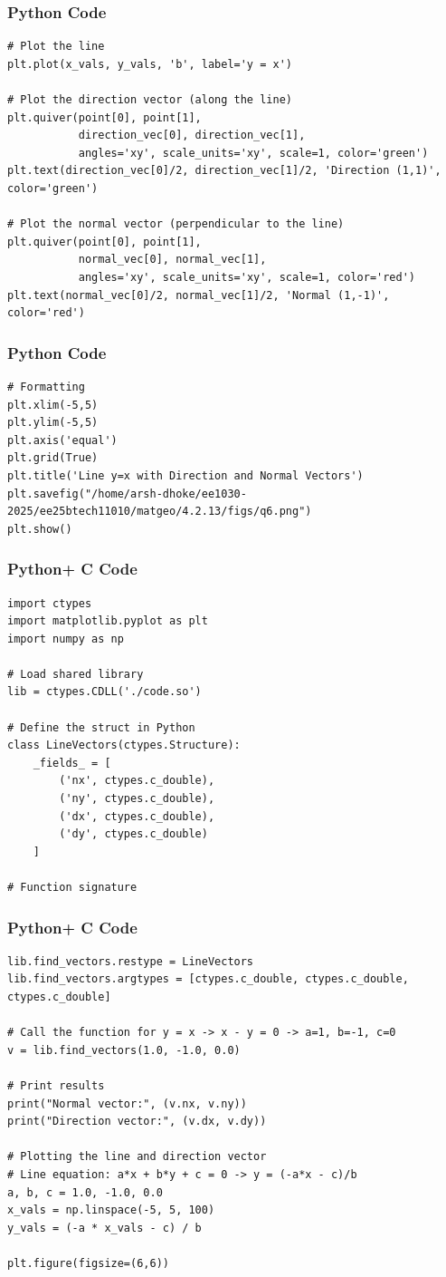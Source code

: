 \documentclass{beamer}
\begin{document}
\begin{frame}[fragile]
    \frametitle{Python Code}
\begin{lstlisting}
# Plot the line
plt.plot(x_vals, y_vals, 'b', label='y = x')

# Plot the direction vector (along the line)
plt.quiver(point[0], point[1],
           direction_vec[0], direction_vec[1],
           angles='xy', scale_units='xy', scale=1, color='green')
plt.text(direction_vec[0]/2, direction_vec[1]/2, 'Direction (1,1)', color='green')

# Plot the normal vector (perpendicular to the line)
plt.quiver(point[0], point[1],
           normal_vec[0], normal_vec[1],
           angles='xy', scale_units='xy', scale=1, color='red')
plt.text(normal_vec[0]/2, normal_vec[1]/2, 'Normal (1,-1)', color='red')
\end{lstlisting}
\end{frame}

\begin{frame}[fragile]
    \frametitle{Python Code}
\begin{lstlisting}
# Formatting
plt.xlim(-5,5)
plt.ylim(-5,5)
plt.axis('equal')
plt.grid(True)
plt.title('Line y=x with Direction and Normal Vectors')
plt.savefig("/home/arsh-dhoke/ee1030-2025/ee25btech11010/matgeo/4.2.13/figs/q6.png")
plt.show()

\end{lstlisting}
\end{frame}

\begin{frame}[fragile]
    \frametitle{Python+ C Code}
\begin{lstlisting}
import ctypes
import matplotlib.pyplot as plt
import numpy as np

# Load shared library
lib = ctypes.CDLL('./code.so')  

# Define the struct in Python
class LineVectors(ctypes.Structure):
    _fields_ = [
        ('nx', ctypes.c_double),
        ('ny', ctypes.c_double),
        ('dx', ctypes.c_double),
        ('dy', ctypes.c_double)
    ]

# Function signature
\end{lstlisting}
\end{frame}

\begin{frame}[fragile]
    \frametitle{Python+ C Code}
\begin{lstlisting}
lib.find_vectors.restype = LineVectors
lib.find_vectors.argtypes = [ctypes.c_double, ctypes.c_double, ctypes.c_double]

# Call the function for y = x -> x - y = 0 -> a=1, b=-1, c=0
v = lib.find_vectors(1.0, -1.0, 0.0)

# Print results
print("Normal vector:", (v.nx, v.ny))
print("Direction vector:", (v.dx, v.dy))

# Plotting the line and direction vector
# Line equation: a*x + b*y + c = 0 -> y = (-a*x - c)/b
a, b, c = 1.0, -1.0, 0.0
x_vals = np.linspace(-5, 5, 100)
y_vals = (-a * x_vals - c) / b

plt.figure(figsize=(6,6))
\end{lstlisting}
\end{frame} 
\end{document}

